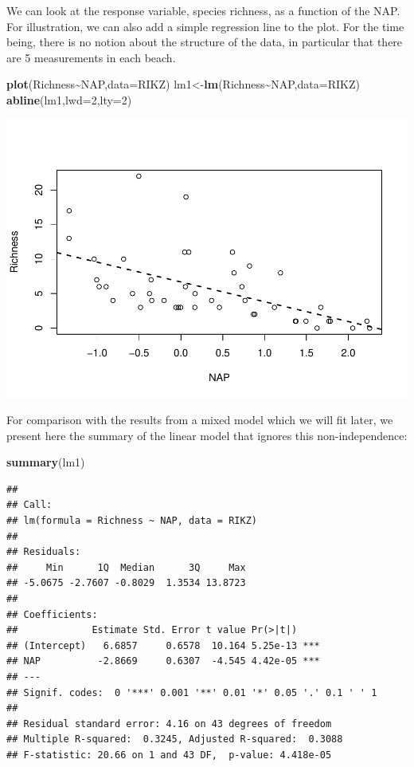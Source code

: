\documentclass[
]{book}
\newenvironment{Shaded}{\begin{snugshade}}{\end{snugshade}}
\newcommand{\AttributeTok}[1]{\textcolor[rgb]{0.13,0.29,0.53}{#1}}
\newcommand{\DecValTok}[1]{\textcolor[rgb]{0.00,0.00,0.81}{#1}}
\newcommand{\FunctionTok}[1]{\textcolor[rgb]{0.13,0.29,0.53}{\textbf{#1}}}
\newcommand{\NormalTok}[1]{#1}
\newcommand{\OtherTok}[1]{\textcolor[rgb]{0.56,0.35,0.01}{#1}}
\newcommand{\SpecialCharTok}[1]{\textcolor[rgb]{0.81,0.36,0.00}{\textbf{#1}}}
\begin{document}
We can look at the response variable, species richness, as a function of the NAP. For illustration, we can also add a simple regression line to the plot. For the time being, there is no notion about the structure of the data, in particular that there are 5 measurements in each beach.

\begin{Shaded}
\begin{Highlighting}[]
\FunctionTok{plot}\NormalTok{(Richness}\SpecialCharTok{\textasciitilde{}}\NormalTok{NAP,}\AttributeTok{data=}\NormalTok{RIKZ)}
\NormalTok{lm1}\OtherTok{\textless{}{-}}\FunctionTok{lm}\NormalTok{(Richness}\SpecialCharTok{\textasciitilde{}}\NormalTok{NAP,}\AttributeTok{data=}\NormalTok{RIKZ)}
\FunctionTok{abline}\NormalTok{(lm1,}\AttributeTok{lwd=}\DecValTok{2}\NormalTok{,}\AttributeTok{lty=}\DecValTok{2}\NormalTok{)}
\end{Highlighting}
\end{Shaded}

\includegraphics{ECOMODbook_files/figure-latex/unnamed-chunk-62-1.pdf}

For comparison with the results from a mixed model which we will fit later, we present here the summary of the linear model that ignores this non-independence:

\begin{Shaded}
\begin{Highlighting}[]
\FunctionTok{summary}\NormalTok{(lm1)}
\end{Highlighting}
\end{Shaded}

\begin{verbatim}
## 
## Call:
## lm(formula = Richness ~ NAP, data = RIKZ)
## 
## Residuals:
##     Min      1Q  Median      3Q     Max 
## -5.0675 -2.7607 -0.8029  1.3534 13.8723 
## 
## Coefficients:
##             Estimate Std. Error t value Pr(>|t|)    
## (Intercept)   6.6857     0.6578  10.164 5.25e-13 ***
## NAP          -2.8669     0.6307  -4.545 4.42e-05 ***
## ---
## Signif. codes:  0 '***' 0.001 '**' 0.01 '*' 0.05 '.' 0.1 ' ' 1
## 
## Residual standard error: 4.16 on 43 degrees of freedom
## Multiple R-squared:  0.3245, Adjusted R-squared:  0.3088 
## F-statistic: 20.66 on 1 and 43 DF,  p-value: 4.418e-05
\end{verbatim}
\end{document}

